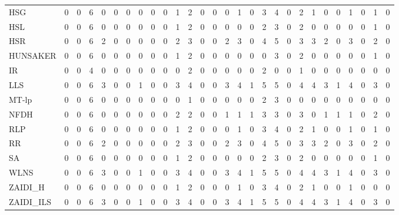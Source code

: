 \begin{table}[htbp]
\begin{tabular}{lrrrrrrrrrrrrrrrrrrrrrrrrrrr}
HSG & 0 & 0 & 6 & 0 & 0 & 0 & 0 & 0 & 0 & 1 & 2 & 0 & 0 & 0 & 1 & 0 & 3 & 4 & 0 & 2 & 1 & 0 & 0 & 1 & 0 & 1 & 0 \\
HSL & 0 & 0 & 6 & 0 & 0 & 0 & 0 & 0 & 0 & 1 & 2 & 0 & 0 & 0 & 0 & 0 & 2 & 3 & 0 & 2 & 0 & 0 & 0 & 0 & 0 & 1 & 0 \\
HSR & 0 & 0 & 6 & 2 & 0 & 0 & 0 & 0 & 0 & 2 & 3 & 0 & 0 & 2 & 3 & 0 & 4 & 5 & 0 & 3 & 3 & 2 & 0 & 3 & 0 & 2 & 0 \\
HUNSAKER & 0 & 0 & 6 & 0 & 0 & 0 & 0 & 0 & 0 & 1 & 2 & 0 & 0 & 0 & 0 & 0 & 0 & 3 & 0 & 2 & 0 & 0 & 0 & 0 & 0 & 1 & 0 \\
IR & 0 & 0 & 4 & 0 & 0 & 0 & 0 & 0 & 0 & 0 & 2 & 0 & 0 & 0 & 0 & 0 & 2 & 0 & 0 & 1 & 0 & 0 & 0 & 0 & 0 & 0 & 0 \\
LLS & 0 & 0 & 6 & 3 & 0 & 0 & 1 & 0 & 0 & 3 & 4 & 0 & 0 & 3 & 4 & 1 & 5 & 5 & 0 & 4 & 4 & 3 & 1 & 4 & 0 & 3 & 0 \\
MT-lp & 0 & 0 & 6 & 0 & 0 & 0 & 0 & 0 & 0 & 0 & 1 & 0 & 0 & 0 & 0 & 0 & 2 & 3 & 0 & 0 & 0 & 0 & 0 & 0 & 0 & 0 & 0 \\
NFDH & 0 & 0 & 6 & 0 & 0 & 0 & 0 & 0 & 0 & 2 & 2 & 0 & 0 & 1 & 1 & 1 & 3 & 3 & 0 & 3 & 0 & 1 & 1 & 1 & 0 & 2 & 0 \\
RLP & 0 & 0 & 6 & 0 & 0 & 0 & 0 & 0 & 0 & 1 & 2 & 0 & 0 & 0 & 1 & 0 & 3 & 4 & 0 & 2 & 1 & 0 & 0 & 1 & 0 & 1 & 0 \\
RR & 0 & 0 & 6 & 2 & 0 & 0 & 0 & 0 & 0 & 2 & 3 & 0 & 0 & 2 & 3 & 0 & 4 & 5 & 0 & 3 & 3 & 2 & 0 & 3 & 0 & 2 & 0 \\
SA & 0 & 0 & 6 & 0 & 0 & 0 & 0 & 0 & 0 & 1 & 2 & 0 & 0 & 0 & 0 & 0 & 2 & 3 & 0 & 2 & 0 & 0 & 0 & 0 & 0 & 1 & 0 \\
WLNS & 0 & 0 & 6 & 3 & 0 & 0 & 1 & 0 & 0 & 3 & 4 & 0 & 0 & 3 & 4 & 1 & 5 & 5 & 0 & 4 & 4 & 3 & 1 & 4 & 0 & 3 & 0 \\
ZAIDI\_H & 0 & 0 & 6 & 0 & 0 & 0 & 0 & 0 & 0 & 1 & 2 & 0 & 0 & 0 & 1 & 0 & 3 & 4 & 0 & 2 & 1 & 0 & 0 & 1 & 0 & 0 & 0 \\
ZAIDI\_ILS & 0 & 0 & 6 & 3 & 0 & 0 & 1 & 0 & 0 & 3 & 4 & 0 & 0 & 3 & 4 & 1 & 5 & 5 & 0 & 4 & 4 & 3 & 1 & 4 & 0 & 3 & 0 \\
\bottomrule
\end{tabular}
\end{table}
